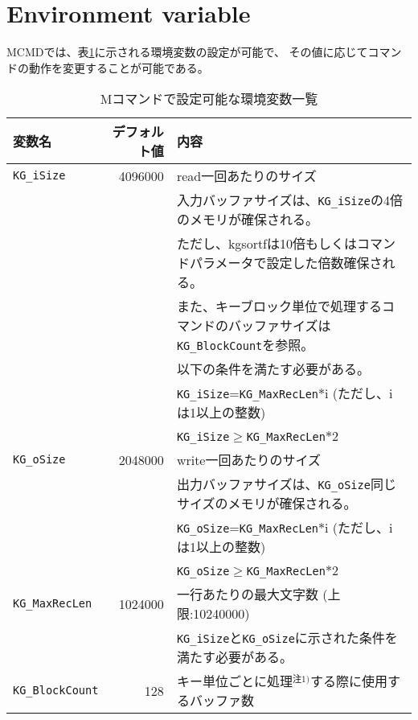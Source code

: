 %

\section{Environment variable}
MCMDでは、表\ref{tb:env}に示される環境変数の設定が可能で、
その値に応じてコマンドの動作を変更することが可能である。

\begin{table}[htpb]
\begin{center}
\caption{Mコマンドで設定可能な環境変数一覧\label{tb:env}}
{\small
\begin{tabular}{l|r|l}
\hline
変数名 & デフォルト値 & 内容\\ \hline
\verb|KG_iSize|          & 4096000 & read一回あたりのサイズ \\
                         &         & 入力バッファサイズは、\verb|KG_iSize|の4倍のメモリが確保される。\\
                         &         & ただし、kgsortfは10倍もしくはコマンドパラメータで設定した倍数確保される。\\
                         &         & また、キーブロック単位で処理するコマンドのバッファサイズは\verb|KG_BlockCount|を参照。\\
                         &         & 以下の条件を満たす必要がある。 \\
                         &         & \verb|KG_iSize|=\verb|KG_MaxRecLen|$*$i (ただし、iは1以上の整数) \\
                         &         & \verb|KG_iSize|$\ge$\verb|KG_MaxRecLen|$*$2\\
\hline
\verb|KG_oSize|          & 2048000 & write一回あたりのサイズ \\
                         &         & 出力バッファサイズは、\verb|KG_oSize|同じサイズのメモリが確保される。\\
                         &         & \verb|KG_oSize|=\verb|KG_MaxRecLen|$*$i (ただし、iは1以上の整数) \\
                         &         & \verb|KG_oSize|$\ge$\verb|KG_MaxRecLen|$*$2\\
\hline
\verb|KG_MaxRecLen|      & 1024000 & 一行あたりの最大文字数 (上限:10240000) \\
                         &         & \verb|KG_iSize|と\verb|KG_oSize|に示された条件を満たす必要がある。\\
\hline
\verb|KG_BlockCount|     &     128 & キー単位ごとに処理$^{注1)}$する際に使用するバッファ数 \\

\end{tabular}}
\end{center}
\end{table}
